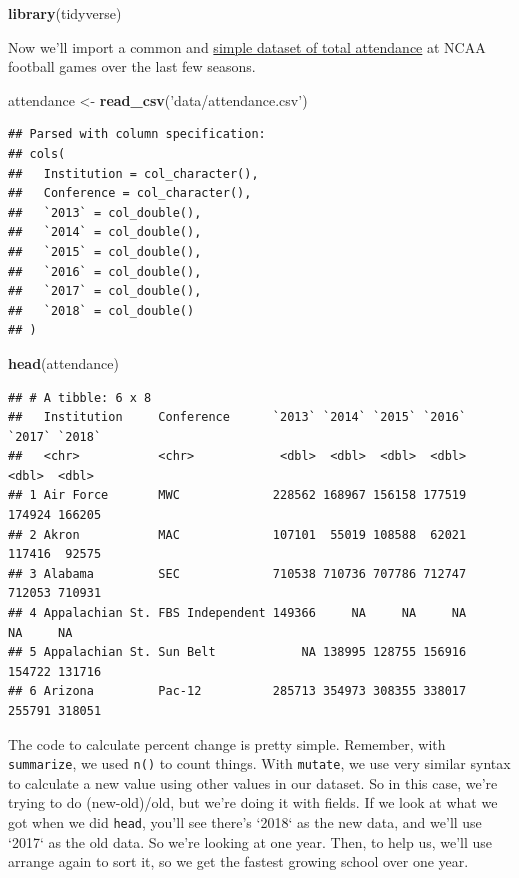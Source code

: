 \documentclass[]{book}
\newenvironment{Shaded}{\begin{snugshade}}{\end{snugshade}}
\newcommand{\KeywordTok}[1]{\textcolor[rgb]{0.13,0.29,0.53}{\textbf{#1}}}
\newcommand{\NormalTok}[1]{#1}
\newcommand{\StringTok}[1]{\textcolor[rgb]{0.31,0.60,0.02}{#1}}
\begin{document}
\begin{Shaded}
\begin{Highlighting}[]
\KeywordTok{library}\NormalTok{(tidyverse)}
\end{Highlighting}
\end{Shaded}

Now we'll import a common and \href{https://unl.box.com/s/etqna5bfvf3b0gsnw0kcjjn1rxx9335s}{simple dataset of total attendance} at NCAA football games over the last few seasons.

\begin{Shaded}
\begin{Highlighting}[]
\NormalTok{attendance <-}\StringTok{ }\KeywordTok{read_csv}\NormalTok{(}\StringTok{'data/attendance.csv'}\NormalTok{)}
\end{Highlighting}
\end{Shaded}

\begin{verbatim}
## Parsed with column specification:
## cols(
##   Institution = col_character(),
##   Conference = col_character(),
##   `2013` = col_double(),
##   `2014` = col_double(),
##   `2015` = col_double(),
##   `2016` = col_double(),
##   `2017` = col_double(),
##   `2018` = col_double()
## )
\end{verbatim}

\begin{Shaded}
\begin{Highlighting}[]
\KeywordTok{head}\NormalTok{(attendance)}
\end{Highlighting}
\end{Shaded}

\begin{verbatim}
## # A tibble: 6 x 8
##   Institution     Conference      `2013` `2014` `2015` `2016` `2017` `2018`
##   <chr>           <chr>            <dbl>  <dbl>  <dbl>  <dbl>  <dbl>  <dbl>
## 1 Air Force       MWC             228562 168967 156158 177519 174924 166205
## 2 Akron           MAC             107101  55019 108588  62021 117416  92575
## 3 Alabama         SEC             710538 710736 707786 712747 712053 710931
## 4 Appalachian St. FBS Independent 149366     NA     NA     NA     NA     NA
## 5 Appalachian St. Sun Belt            NA 138995 128755 156916 154722 131716
## 6 Arizona         Pac-12          285713 354973 308355 338017 255791 318051
\end{verbatim}

The code to calculate percent change is pretty simple. Remember, with \texttt{summarize}, we used \texttt{n()} to count things. With \texttt{mutate}, we use very similar syntax to calculate a new value using other values in our dataset. So in this case, we're trying to do (new-old)/old, but we're doing it with fields. If we look at what we got when we did \texttt{head}, you'll see there's `2018` as the new data, and we'll use `2017` as the old data. So we're looking at one year. Then, to help us, we'll use arrange again to sort it, so we get the fastest growing school over one year.
\end{document}
